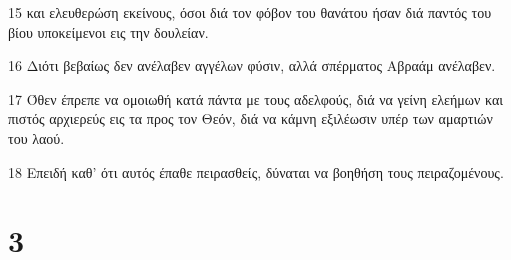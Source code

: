 \par 15 και ελευθερώση εκείνους, όσοι διά τον φόβον του θανάτου ήσαν διά παντός του βίου υποκείμενοι εις την δουλείαν.
\par 16 Διότι βεβαίως δεν ανέλαβεν αγγέλων φύσιν, αλλά σπέρματος Αβραάμ ανέλαβεν.
\par 17 Όθεν έπρεπε να ομοιωθή κατά πάντα με τους αδελφούς, διά να γείνη ελεήμων και πιστός αρχιερεύς εις τα προς τον Θεόν, διά να κάμνη εξιλέωσιν υπέρ των αμαρτιών του λαού.
\par 18 Επειδή καθ' ότι αυτός έπαθε πειρασθείς, δύναται να βοηθήση τους πειραζομένους.

\chapter{3}


